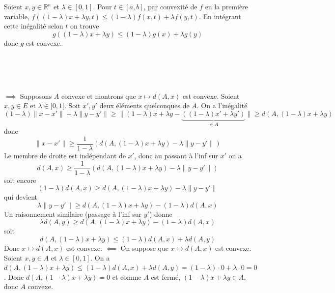 \documentclass{report}
\begin{document}
\subsection{} \noindent{}\\ 
\\ 
\\
\noindent Soient $x,y\in \mathbb R^n$ et $\lambda \in [0,1]$. Pour $t\in [a,b]$, par convexité de $f$ en la première variable, $f((1-\lambda)x+\lambda y,t)\leq (1-\lambda)f(x,t) + \lambda f(y,t)$.\newline
En intégrant cette inégalité selon $t$ on trouve $$g((1-\lambda)x+\lambda y)\leq (1-\lambda)g(x) + \lambda g(y)$$ donc $g$ est convexe.

\subsection{} \noindent{}\\ 
\\ 
\\
\noindent $\implies$ Supposons $A$ convexe et montrons que $x\mapsto d(A,x)$ est convexe. Soient $x,y\in E$ et $\lambda\in ]0,1[$.\newline
Soit $x',y'$ deux éléments quelconques de $A$. On a l'inégalité $$(1-\lambda)\|x-x'\| + \lambda \|y-y'\|\geq \|(1-\lambda)x+\lambda y- \underbrace{(	(1-\lambda)x'+\lambda y')}_{\in A}\|\geq d(A, (1-\lambda)x+\lambda y)$$ 
donc $$\|x-x'\| \geq \frac{1}{1-\lambda } (d(A, (1-\lambda)x+\lambda y) -\lambda \|y-y'\|)$$
Le membre de droite est indépendant de $x'$, donc au passant à l'inf sur $x'$ on a
$$d(A,x)\geq \frac{1}{1-\lambda } (d(A, (1-\lambda)x+\lambda y) -\lambda \|y-y'\|) $$
soit encore $$ (1-\lambda )d(A,x)\geq  d(A, (1-\lambda)x+\lambda y) -\lambda \|y-y'\|$$
qui devient $$ \lambda \|y-y'\| \geq d(A, (1-\lambda)x+\lambda y) - (1-\lambda )d(A,x)$$
Un raisonnement similaire (passage à l'inf sur $y'$) donne 
$$\lambda d(A,y) \geq d(A, (1-\lambda)x+\lambda y) - (1-\lambda )d(A,x)$$
soit $$ d(A, (1-\lambda)x+\lambda y) \leq (1-\lambda )d(A,x) + \lambda d(A,y)$$
Donc $x\mapsto d(A,x)$ est convexe.\newline
\newline 
$\impliedby$ On suppose que $x\mapsto d(A,x)$ est convexe. Soient $x,y\in A$ et $\lambda\in [0,1]$. \newline
On a $d(A,(1-\lambda)x+\lambda y)\leq (1-\lambda)d(A,x) + \lambda d(A,y) = (1-\lambda)\cdot 0+ \lambda \cdot 0 = 0$.\newline
Donc $d(A,(1-\lambda)x+\lambda y)=0$ et comme $A$ est fermé, $(1-\lambda)x+\lambda y\in A$, donc $A$ convexe.
\end{document}
